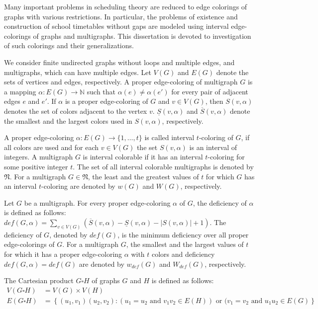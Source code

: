 Many important problems in scheduling theory are reduced to edge colorings of graphs with various restrictions. In particular, the problems of existence and construction of school timetables without gaps are modeled using interval edge-colorings of graphs and multigraphs. This dissertation is devoted to investigation of such colorings and their generalizations.

We consider finite undirected graphs without loops and multiple edges, and multigraphs, which can have multiple edges. Let $V(G)$ and $E(G)$ denote the sets of vertices and edges, respectively. A proper edge-coloring of multigraph $G$ is a mapping $\alpha : E(G) \rightarrow \mathbb{N}$ such that $\alpha(e) \ne \alpha(e')$ for every pair of adjacent edges $e$ and $e'$. If $\alpha$ is a proper edge-coloring of $G$ and $v\in V(G)$, then $S(v,\alpha)$ denotes the set of colors adjacent to the vertex $v$. $\underline{S}(v, \alpha)$ and $\overline{S}(v, \alpha)$ denote the smallest and the largest colors used in $S(v,\alpha)$, respectively.

A proper edge-coloring $\alpha : E(G) \rightarrow \{1,\ldots,t\}$ is called interval $t$-coloring of $G$, if all colors are used and for each $v\in V(G)$ the set $S(v,\alpha)$ is an interval of integers. A multigraph $G$ is interval colorable
if it has an interval $t$-coloring for some positive integer $t$. The set of all interval colorable multigraphs is denoted by $\mathfrak{N}$. For a multigraph $G \in \mathfrak{N}$, the least and the greatest values of $t$ for which $G$ has an interval $t$-coloring are denoted by $w(G)$ and $W(G)$, respectively. 

Let $G$ be a multigraph. For every proper edge-coloring $\alpha$ of $G$, the deficiency of $\alpha$ is defined as follows: $def(G, \alpha) = \sum\limits_{v\in V(G)}{\left(\overline{S}(v,\alpha)-\underline{S}(v,\alpha) - |S(v,\alpha)|+1\right)}$. The deficiency of $G$, denoted by $def(G)$, is the minimum deficiency over all proper edge-colorings of $G$. For a multigraph $G$, the smallest and the largest values of $t$ for which it has a proper edge-coloring $\alpha$ with $t$ colors and deficiency $def(G, \alpha) = def(G)$ are denoted by $w_{def}(G)$ and $W_{def}(G)$, respectively.

The Cartesian product $G \square H$ of graphs $G$ and $H$ is defined as follows:
\begin{align*}
V(G \square H) &= V(G) \times V(H) \\
E(G \square H) &= \left\{(u_1,v_1)(u_2,v_2) : (u_1=u_2 \text{ and } v_1v_2 \in E(H)) \text{ or } (v_1=v_2 \text{ and } u_1u_2 \in E(G) \right\}
\end{align*}


